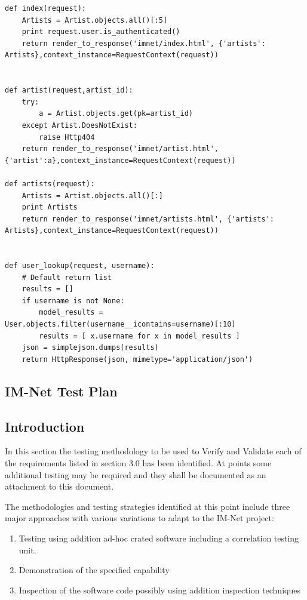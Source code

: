 \documentclass[letterpaper,12pt]{article}
\newcommand{\Section}[1]{\section{#1} \setcounter{figure}{0}}
\begin{document}
{\begin{verbatim}
def index(request):
    Artists = Artist.objects.all()[:5]
    print request.user.is_authenticated()
    return render_to_response('imnet/index.html', {'artists': Artists},context_instance=RequestContext(request))


def artist(request,artist_id):
    try:
        a = Artist.objects.get(pk=artist_id)
    except Artist.DoesNotExist:
        raise Http404
    return render_to_response('imnet/artist.html', {'artist':a},context_instance=RequestContext(request))

def artists(request):
    Artists = Artist.objects.all()[:]
    print Artists
    return render_to_response('imnet/artists.html', {'artists': Artists},context_instance=RequestContext(request))


def user_lookup(request, username):
    # Default return list
    results = []
    if username is not None:
        model_results = User.objects.filter(username__icontains=username)[:10]
        results = [ x.username for x in model_results ]
    json = simplejson.dumps(results)
    return HttpResponse(json, mimetype='application/json')
\end{verbatim}

\eject 

\textcolor{section}{\Section{IM-Net Test Plan}}

\textcolor{subsection}{\subsection{Introduction}}

In this section the testing methodology to be used to Verify and Validate each of the requirements listed in section 3.0 has been identified. At points some additional testing may be required and they shall be documented as an attachment to this document. 

The methodologies and testing strategies identified at this point include three major approaches with various variations to adapt to the IM-Net project:

\begin{enumerate}
\item  Testing using addition ad-hoc crated software including a correlation testing unit.

\item  Demonstration of the specified capability

\item  Inspection of the software code possibly using addition inspection techniques
\end{enumerate}

}
\end{document}
